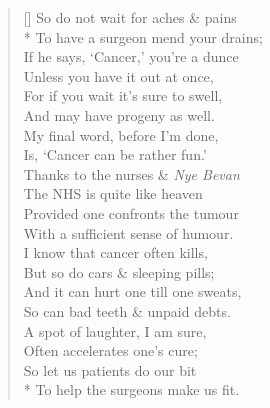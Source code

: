 \documentclass[MAIN]{subfiles}
\begin{document}
\begin{verse}[\versewidth]
So do not wait for aches \& pains\\*
To have a surgeon mend your drains;\\
If he says, `Cancer,' you're a dunce\\
Unless you have it out at once,\\
For if you wait it's sure to swell,\\
And may have progeny as well.\\
My final word, before I'm done,\\
Is, `Cancer can be rather fun.'\\
Thanks to the nurses \& \emph{Nye Bevan}\\
The NHS is quite like heaven\\
Provided one confronts the tumour\\
With a sufficient sense of humour.\\
I know that cancer often kills,\\
But so do cars \& sleeping pills;\\
And it can hurt one till one sweats,\\
So can bad teeth \& unpaid debts.\\
A spot of laughter, I am sure,\\
Often accelerates one's cure;\\
So let us patients do our bit\\*
To help the surgeons make us fit.
\end{verse}
\end{document}
